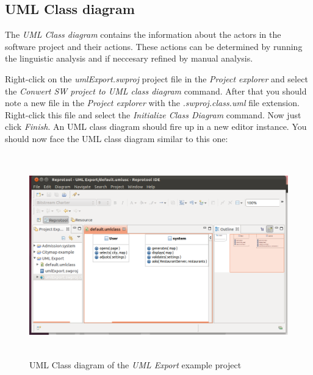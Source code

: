 \newpage

\subsection{UML Class diagram}
The \emph{UML Class diagram} contains the information about the actors in the software project and their actions. These actions can
be determined by running the linguistic analysis and if neccesary refined by manual analysis.

Right-click on the \emph{umlExport.swproj} project file in the \emph{Project explorer} and select the \emph{Conwert SW project to UML class
diagram} command. After that you should note a new file in the \emph{Project explorer} with the \emph{.swproj.class.uml} file extension.
Right-click this file and select the \emph{Initialize Class Diagram} command. Now just click \emph{Finish}. An UML class diagram should
fire up in a new editor instance. You should now face the UML class diagram similar to this one:

\begin{figure}[ht]
  \centering
  \includegraphics[height=250pt]{images/reprotoolClassDiagram}
  \caption{UML Class diagram of the \emph{UML Export} example project}
  \label{fig:reprotoolClassDiagram}
\end{figure}